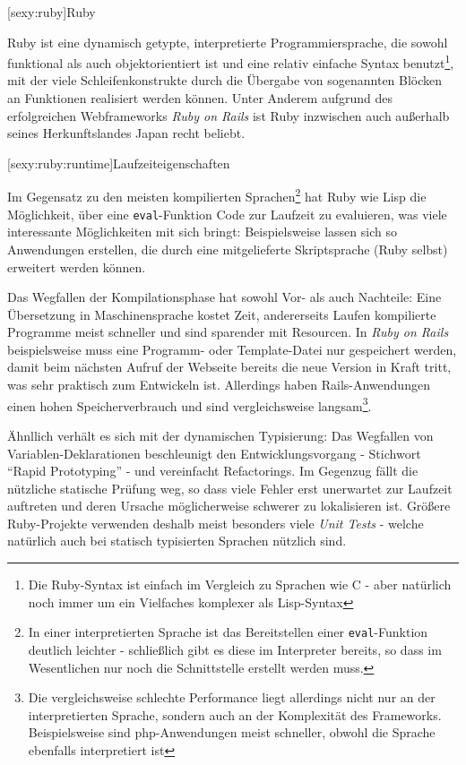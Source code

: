 \documentclass[a4paper, bibgerm]{book}
\newcommand\icode[1]{\lstinline?#1?}
\newcommand\lsection{}
\newcommand\lsubsection{}
\begin{document}
\lsection[sexy:ruby]{Ruby}

Ruby ist eine dynamisch getypte, interpretierte Programmiersprache, die
sowohl funktional als auch objektorientiert ist und eine relativ
einfache Syntax benutzt\footnote{Die Ruby-Syntax ist einfach im
  Vergleich zu Sprachen wie C - aber natürlich noch immer um ein
  Vielfaches komplexer als Lisp-Syntax}, mit der viele
Schleifenkonstrukte durch die Übergabe von sogenannten Blöcken an
Funktionen realisiert werden können.  Unter Anderem aufgrund des
erfolgreichen Webframeworks \textit{Ruby on Rails} ist Ruby inzwischen
auch außerhalb seines Herkunftslandes Japan recht beliebt.

\lsubsection[sexy:ruby:runtime]{Laufzeiteigenschaften} 

Im Gegensatz zu den meisten kompilierten Sprachen\footnote{In einer
  interpretierten Sprache ist das Bereitstellen einer
  \icode{eval}-Funktion deutlich leichter - schließlich gibt es diese im
Interpreter bereits, so dass im Wesentlichen nur noch die Schnittstelle
erstellt werden muss.} hat Ruby wie Lisp die
Möglichkeit, über eine \icode{eval}-Funktion Code zur Laufzeit zu
evaluieren, was viele interessante Möglichkeiten mit sich bringt:
Beispielsweise lassen sich so Anwendungen erstellen, die durch eine
mitgelieferte Skriptsprache (Ruby selbst) erweitert werden können.

Das Wegfallen der Kompilationsphase hat sowohl Vor- als auch Nachteile:
Eine Übersetzung in Maschinensprache kostet Zeit, andererseits Laufen
kompilierte Programme meist schneller und sind sparender mit
Resourcen. In \textit{Ruby on Rails} beispielsweise muss eine Programm-
oder Template-Datei nur gespeichert werden, damit beim nächsten Aufruf
der Webseite bereits die neue Version in Kraft tritt, was sehr praktisch
zum Entwickeln ist. Allerdings haben Rails-Anwendungen einen hohen
Speicherverbrauch und sind vergleichsweise langsam\footnote{Die
  vergleichsweise schlechte Performance liegt allerdings nicht nur an
  der interpretierten Sprache, sondern auch an der Komplexität des
  Frameworks. Beispielsweise sind php-Anwendungen meist schneller,
  obwohl die Sprache ebenfalls interpretiert ist}.

Ähnllich verhält es sich mit der dynamischen Typisierung: Das Wegfallen
von Variablen-Deklarationen beschleunigt den Entwicklungsvorgang -
Stichwort "`Rapid Prototyping"' - und vereinfacht Refactorings. Im
Gegenzug fällt die nützliche statische Prüfung weg, so dass viele Fehler
erst unerwartet zur Laufzeit auftreten und deren Ursache möglicherweise
schwerer zu lokalisieren ist. Größere Ruby-Projekte verwenden deshalb meist
besonders viele \textit{Unit Tests} - welche natürlich auch bei statisch
typisierten Sprachen nützlich sind.
\end{document}
